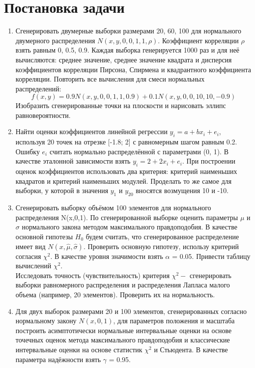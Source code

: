 \documentclass[14pt,a4paper,article]{ncc}
\begin{document}
\section{Постановка задачи}
\begin{enumerate}
    \item Сгенерировать двумерные выборки размерами 20, 60, 100 для нормального двумерного распределения $N(x,y,0,0,1,1,\rho)$. Коэффициент корреляции $\rho$ взять равным 0, 0.5, 0.9. Каждая выборка генерируется 1000 раз и для неё вычисляются: среднее значение, среднее значение квадрата и дисперсия коэффициентов корреляции Пирсона, Спирмена и квадрантного коэффициента корреляции. Повторить все вычисления для смеси нормальных распределений:
\begin{equation}
	f(x,y) = 0.9N(x,y,0,0,1,1,0.9) + 0.1N(x,y,0,0,10,10,-0.9)
\end{equation}
Изобразить сгенерированные точки на плоскости и нарисовать эллипс равновероятности.
    \item Найти оценки коэффициентов линейной регрессии $y_{i} = a + bx_{i} + e_{i}$, используя 20 точек на отрезке [-1.8; 2] с равномерным шагом равным 0.2. Ошибку $e_{i}$ считать нормально распределённой с параметрами (0, 1). В качестве эталонной зависимости взять $y_{i} = 2 + 2x_{i} + e_{i}$. При построении оценок коэффициентов использовать два критерия: критерий наименьших квадратов и критерий наименьших модулей. Проделать то же самое для выборки, у которой в значения $y_{1}$ и $y_{20}$ вносятся возмущения 10 и -10. 
    \item Сгенерировать выборку объёмом 100 элементов для нормального распределения N(x,0,1). По сгенерированной выборке оценить параметры $\mu$ и $\sigma$ нормального закона методом максимального правдоподобия. В качестве основной гипотезы $H_{0}$ будем считать, что сгенерированное распределение имеет вид $N(x,\hat{\mu}, \hat{\sigma})$. Проверить основную гипотезу, использу критерий согласия $\chi^{2}$. В качестве уровня значимости взять $\alpha$ = 0.05. Привести таблицу вычислений $\chi^{2}$.\\ 
     Исследовать точность (чувствительность) критерия $\chi^{2} - $ сгенерировать выборки равномерного распределения и распределения Лапласа малого объема (например, 20 элементов). Проверить их на нормальность.
     \item Для двух выборок размерами 20 и 100 элементов, сгенерированных согласно нормальному закону $N(x,0,1)$, для параметров положения и масштаба построить асимптотически нормальные интервальные оценки на основе точечных оценок метода максимального правдоподобия и классические интервальные оценки на основе статистик $\chi^{2}$ и Стьюдента. В качестве параметра надёжности взять $\gamma$ = 0.95.
\end{enumerate}
\end{document}
